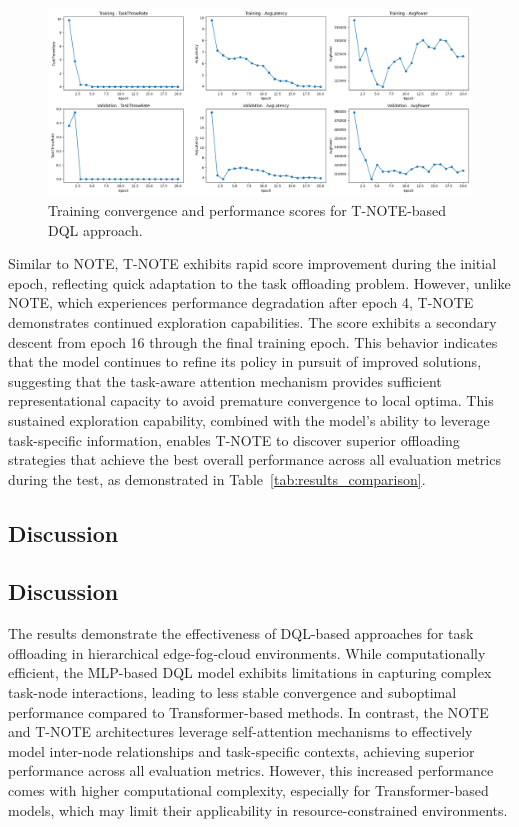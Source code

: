\documentclass[preprint,3p,authoryear]{elsarticle}
\begin{document}
\begin{figure}[H]
    \centering
    \includegraphics[width=1\linewidth]{figs/T-NOTE/score_plot.png}
    \caption{Training convergence and performance scores for T-NOTE-based DQL approach.}
    \label{fig:T-NOTE-score-plot}
\end{figure}

Similar to NOTE, T-NOTE exhibits rapid score improvement during the initial epoch, reflecting quick adaptation to the task offloading problem. However, unlike NOTE, which experiences performance degradation after epoch 4, T-NOTE demonstrates continued exploration capabilities. The score exhibits a secondary descent from epoch 16 through the final training epoch. This behavior indicates that the model continues to refine its policy in pursuit of improved solutions, suggesting that the task-aware attention mechanism provides sufficient representational capacity to avoid premature convergence to local optima. This sustained exploration capability, combined with the model's ability to leverage task-specific information, enables T-NOTE to discover superior offloading strategies that achieve the best overall performance across all evaluation metrics during the test, as demonstrated in Table~\ref{tab:results_comparison}.

\subsection{Discussion}

\subsection{Discussion}

The results demonstrate the effectiveness of DQL-based approaches for task offloading in hierarchical edge-fog-cloud environments. While computationally efficient, the MLP-based DQL model exhibits limitations in capturing complex task-node interactions, leading to less stable convergence and suboptimal performance compared to Transformer-based methods. In contrast, the NOTE and T-NOTE architectures leverage self-attention mechanisms to effectively model inter-node relationships and task-specific contexts, achieving superior performance across all evaluation metrics. However, this increased performance comes with higher computational complexity, especially for Transformer-based models, which may limit their applicability in resource-constrained environments.
\end{document}
